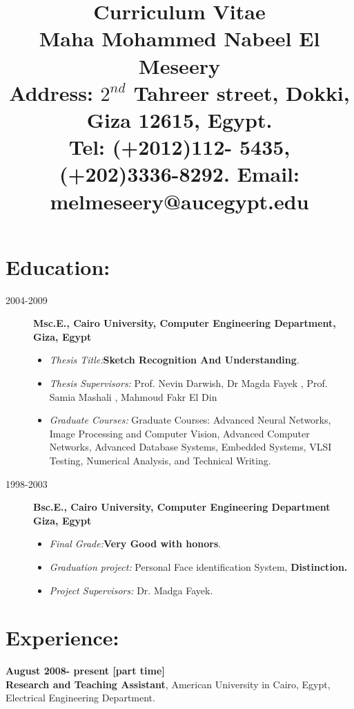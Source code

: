 \documentclass{article}
\title {Curriculum Vitae \\ Maha Mohammed Nabeel El
Meseery\\ \small \textbf{ Address:} $2^{nd}$ Tahreer street, Dokki, Giza 12615,
Egypt. \\ \textbf{Tel:} (+2012)112- 5435, (+202)3336-8292.
\textbf{Email:} melmeseery@aucegypt.edu}
\date{}
\begin{document}
\maketitle

 \section*{Education:}
  \begin{description}
\item [2004-2009]  \textbf{ Msc.E., Cairo University, Computer Engineering Department, Giza, Egypt}
  \begin{itemize}
    \item \textit{ Thesis Title:}\textbf{Sketch Recognition And Understanding}.
    \item \textit{Thesis Supervisors:} Prof. Nevin Darwish, Dr Magda Fayek , Prof. Samia
 Mashali , Mahmoud Fakr El Din
 \item \textit{ Graduate Courses:} Graduate Courses: Advanced Neural Networks, Image
 Processing and Computer Vision, Advanced Computer Networks, Advanced Database Systems, Embedded Systems, VLSI Testing, Numerical Analysis, and Technical Writing.

\end{itemize}

 \item[1998-2003]  \textbf{ Bsc.E., Cairo University, Computer Engineering Department Giza, Egypt}
   \begin{itemize}
    \item \textit{Final Grade:}\textbf{Very Good with honors}.
  \item \textit{Graduation project:} Personal Face identification System, \textbf{Distinction.}
  \item \textit{Project Supervisors:} Dr. Madga Fayek.
\end{itemize}
  \end{description}

 \section*{Experience:}
 \textbf{August 2008- present   [part time]}\\
 \textbf{Research and Teaching Assistant}, American University in Cairo, Egypt,
 Electrical Engineering Department.
\end{document}
